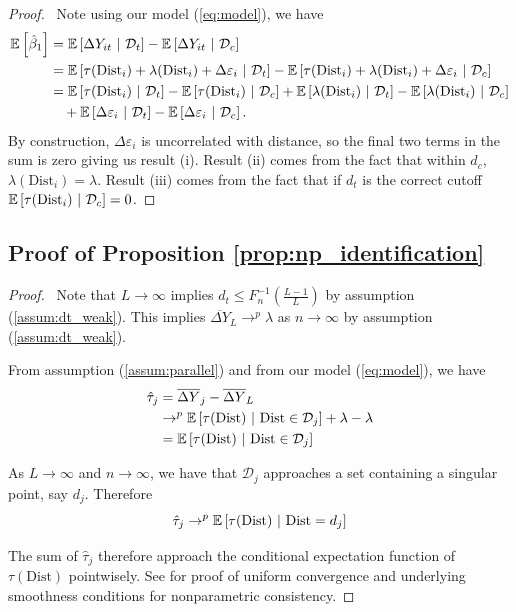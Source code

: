 \documentclass[12pt]{article}
\newcommand{\dist}{\text{Dist}}
\begin{document}
\begin{proof}
    \ Note using our model (\ref{eq:model}), we have 
    \begin{align*}
        \expec{\hat{\beta}_1} &= \condexpec{\Delta Y_{it}}{\mathcal{D}_t} - \condexpec{\Delta Y_{it}}{\mathcal{D}_c} \\
        &= \condexpec{\tau(\dist_i) + \lambda(\dist_i) + \Delta \varepsilon_{i}}{\mathcal{D}_t} - \condexpec{\tau(\dist_i) + \lambda(\dist_i) + \Delta \varepsilon_{i}}{\mathcal{D}_c} \\ 
        &= \condexpec{\tau(\dist_i)}{\mathcal{D}_t} - \condexpec{\tau(\dist_i)}{\mathcal{D}_c} + \condexpec{\lambda(\dist_i)}{\mathcal{D}_t} - \condexpec{\lambda(\dist_i)}{\mathcal{D}_c} \\ 
        &\quad + \condexpec{\Delta\varepsilon_i}{\mathcal{D}_t} - \condexpec{\Delta\varepsilon_i}{\mathcal{D}_c}.
    \end{align*}
    By construction, $\Delta \varepsilon_i$ is uncorrelated with distance, so the final two terms in the sum is zero giving us result (i). Result (ii) comes from the fact that within $d_c$, $\lambda(\dist_i) = \lambda$. Result (iii) comes from the fact that if $d_t$ is the correct cutoff $\condexpec{\tau(\dist_i)}{\mathcal{D}_c} = 0$.
\end{proof}

\subsection{Proof of Proposition \ref{prop:np_identification}}

\begin{proof}
    \ Note that $L \to \infty$ implies $d_t \leq F_n^{-1}(\frac{L-1}{L})$ by assumption (\ref{assum:dt_weak}). This implies $\overline{\Delta Y}_L \to^p \lambda$ as $n \to \infty$ by assumption (\ref{assum:dt_weak}). 
    
    From assumption (\ref{assum:parallel}) and from our model (\ref{eq:model}), we have
    \begin{align*}
        \hat{\tau}_j &= \overline{\Delta Y}_j - \overline{\Delta Y}_L \\
        &\to^p \condexpec{\tau(\dist)}{\dist \in \mathcal{D}_j} + \lambda - \lambda \\
        &= \condexpec{\tau(\dist)}{\dist \in \mathcal{D}_j}
    \end{align*}

    As $L \to \infty$ and $n \to \infty$, we have that $\mathcal{D}_j$ approaches a set containing a singular point, say $d_j$. Therefore 
    $$ 
        \hat{\tau}_j \to^p \condexpec{\tau(\dist)}{\dist = d_j}
    $$

    The sum of $\hat{\tau}_j$ therefore approach the conditional expectation function of $\tau(\dist)$ pointwisely. See \citet{Cattaneo_Farrell_Feng_2019} for proof of uniform convergence and underlying smoothness conditions for nonparametric consistency.
\end{proof}
\end{document}
